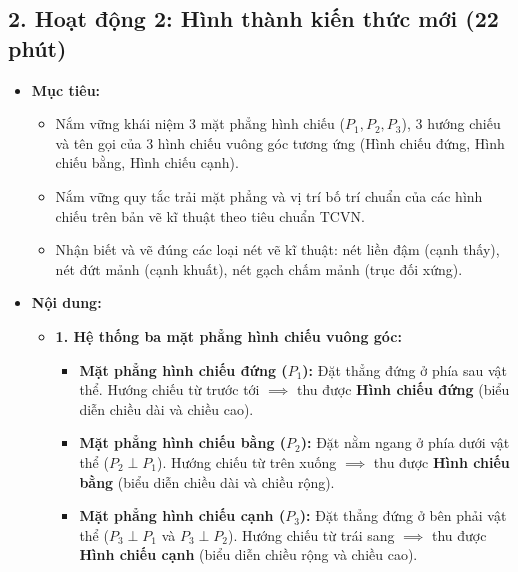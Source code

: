 \documentclass[12pt, a4paper]{article}
\begin{document}
\subsection*{2. Hoạt động 2: Hình thành kiến thức mới (22 phút)}

\begin{itemize}[leftmargin=1.2cm]
    \item[a)] \textbf{Mục tiêu:}
    \begin{itemize}[leftmargin=0.6cm]
        \item Nắm vững khái niệm 3 mặt phẳng hình chiếu ($P_1, P_2, P_3$), 3 hướng chiếu và tên gọi của 3 hình chiếu vuông góc tương ứng (Hình chiếu đứng, Hình chiếu bằng, Hình chiếu cạnh).
        \item Nắm vững quy tắc trải mặt phẳng và vị trí bố trí chuẩn của các hình chiếu trên bản vẽ kĩ thuật theo tiêu chuẩn TCVN.
        \item Nhận biết và vẽ đúng các loại nét vẽ kĩ thuật: nét liền đậm (cạnh thấy), nét đứt mảnh (cạnh khuất), nét gạch chấm mảnh (trục đối xứng).
    \end{itemize}

    \item[b)] \textbf{Nội dung:}
    \begin{itemize}[leftmargin=0.6cm]
        \item \textbf{1. Hệ thống ba mặt phẳng hình chiếu vuông góc:}
        \begin{itemize}
            \item \textbf{Mặt phẳng hình chiếu đứng ($P_1$):} Đặt thẳng đứng ở phía sau vật thể. Hướng chiếu từ trước tới $\implies$ thu được \textbf{Hình chiếu đứng} (biểu diễn chiều dài và chiều cao).
            \item \textbf{Mặt phẳng hình chiếu bằng ($P_2$):} Đặt nằm ngang ở phía dưới vật thể ($P_2 \perp P_1$). Hướng chiếu từ trên xuống $\implies$ thu được \textbf{Hình chiếu bằng} (biểu diễn chiều dài và chiều rộng).
            \item \textbf{Mặt phẳng hình chiếu cạnh ($P_3$):} Đặt thẳng đứng ở bên phải vật thể ($P_3 \perp P_1$ và $P_3 \perp P_2$). Hướng chiếu từ trái sang $\implies$ thu được \textbf{Hình chiếu cạnh} (biểu diễn chiều rộng và chiều cao).
        \end{itemize}


\end{itemize}
\end{itemize}
\end{document}

